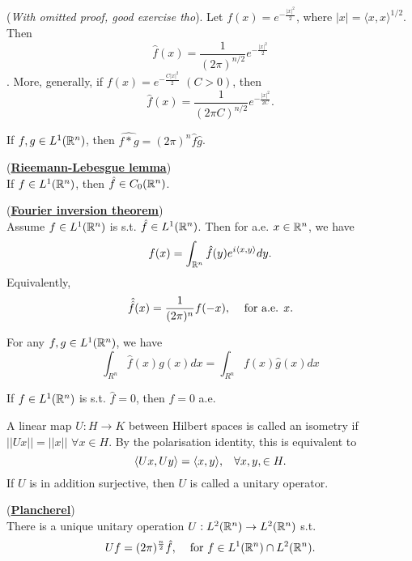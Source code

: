 \begin{example}(\textit{With omitted proof, good exercise tho}).
    Let $f(x)=e^{-\frac{|x|^2}{2}}$, where $|x|=\langle x,x\rangle^{1/2}$. Then \[\hat f(x)=\frac{1}{(2\pi)^{n/2}}e^{-\frac{|x|^2}{2}}\].
    More, generally, if $f(x) =e^{-\frac{C|x|^2}{2}} $ $(C>0)$, then \[\hat f(x)=\frac{1}{(2\pi C)^{n/2}}e^{-\frac{|x|^2}{2C}}.\]
\end{example}



\begin{proposition}
    If $f,g\in L^1(\mathbb{R}^n)$, then $\widehat{f*g} = (2\pi)^n \hat f \hat g$.
\end{proposition}

\begin{lemma}(\textbf{\underline{Rieemann-Lebesgue lemma}})\\
    
If $f\in L^1(\mathbb{R}^n)$, then $\hat f\in C_0(\mathbb{R}^n)$.
    
\end{lemma}

\begin{theorem}(\underline{\textbf{Fourier inversion theorem}})\\

    Assume $f\in L^1(\mathbb{R}^n)$ is s.t. $\hat f\in L^1(\mathbb{R}^n)$. Then for a.e. $x\in \mathbb{R}^n$, we have \[f(x)=\int_{\mathbb{R}^n}\hat f(y)e^{i\langle x,y\rangle}dy.\]
    Equivalently, \[\hat{\hat{f}}(x) = \frac{1}{(2\pi)^n}f(-x),\hspace{3mm} \text{ for a.e. } x.\]
     
\end{theorem}

\begin{lemma}
    For any $f,g\in L^1(\mathbb{R}^n)$, we have \[\int_{R^n}\hat f(x) g(x)dx =\int_{R^n} f(x)\hat g(x)dx \]
\end{lemma}

\begin{corollary}
    If $f\in L^1(\mathbb{R}^n)$ is s.t. $\hat f=0$, then $f=0$ a.e.
\end{corollary}

A linear map $U:H\rightarrow K$ between Hilbert spaces is called an isometry if $||Ux||=||x||$ $\forall x\in H.$
By the polarisation identity, this is equivalent to \[ \langle Ux,Uy\rangle = \langle x,y\rangle,\hspace{3mm}\forall x,y,\in H.\]
If $U$ is in addition surjective, then $U$ is called a unitary operator. 

\begin{theorem}(\underline{\textbf{Plancherel}})\\
   
    There is a unique unitary operation $U:L^2(\mathbb{R}^n)\rightarrow L^2(\mathbb{R}^n)$ s.t. \[ Uf = (2\pi)^{\frac{n}{2}}\hat f,\hspace{4mm}\text{for } f\in L^1(\mathbb{R}^n)\cap L^2(\mathbb{R}^n).\]  
    
\end{theorem}

